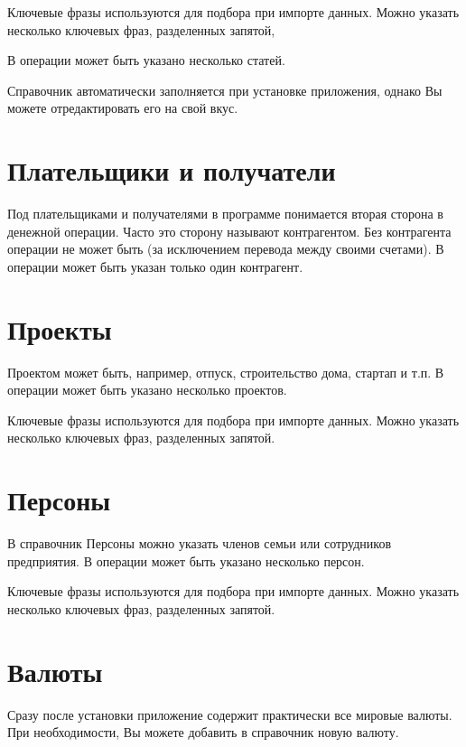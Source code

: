 \documentclass[a4paper,10pt,russian]{sphinxmanual}
\begin{document}
\sphinxAtStartPar
Ключевые фразы используются для подбора при импорте данных. Можно указать несколько ключевых фраз, разделенных запятой,

\sphinxAtStartPar
В операции может быть указано несколько статей.

\sphinxAtStartPar
Справочник автоматически заполняется при установке приложения, однако Вы можете отредактировать его на свой вкус.


\section{Плательщики и получатели}
\label{\detokenize{directories:id7}}
\sphinxAtStartPar
Под плательщиками и получателями в программе понимается вторая сторона в денежной операции. Часто это сторону называют
контрагентом. Без контрагента операции не может быть (за исключением перевода между своими счетами). В операции может быть
указан только один контрагент.


\section{Проекты}
\label{\detokenize{directories:id8}}
\sphinxAtStartPar
Проектом может быть, например, отпуск, строительство дома, стартап и т.п. В операции может быть указано несколько проектов.

\sphinxAtStartPar
Ключевые фразы используются для подбора при импорте данных. Можно указать несколько ключевых фраз, разделенных запятой.


\section{Персоны}
\label{\detokenize{directories:id9}}
\sphinxAtStartPar
В справочник Персоны можно указать членов семьи или сотрудников предприятия. В операции может быть указано несколько персон.

\sphinxAtStartPar
Ключевые фразы используются для подбора при импорте данных. Можно указать несколько ключевых фраз, разделенных запятой.

\noindent{}
\noindent{}
\noindent{}


\section{Валюты}
\label{\detokenize{directories:id10}}
\sphinxAtStartPar
Сразу после установки приложение содержит практически все мировые валюты. При необходимости, Вы можете добавить в справочник новую валюту.
\end{document}
